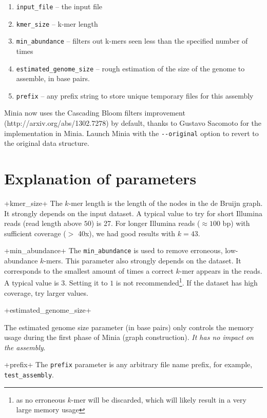 \documentclass[a4paper]{article}
\begin{document}
\begin{enumerate}

\item \verb+input_file+ -- the input file

\item \verb+kmer_size+  -- k-mer length 

\item \verb+min_abundance+ -- filters out k-mers seen less than the specified number of times

\item \verb+estimated_genome_size+ -- rough estimation of the size of the genome to assemble, in base pairs.

\item \verb+prefix+ -- any prefix string to store unique temporary files for this assembly

\end{enumerate}

Minia now uses the Cascading Bloom filters improvement (http://arxiv.org/abs/1302.7278) by default, thanks to Gustavo Sacomoto for the implementation in Minia. Launch Minia with the \verb!--original! option to revert to the original data structure.


\section{Explanation of parameters}
\begin{description}

\vitem+kmer_size+
The $k$-mer length is the length of the nodes in the de Bruijn graph. It strongly depends on the input dataset. A typical value to try for short Illumina reads (read length above $50$) is 27. For longer Illumina reads ($\approx 100$ bp) with sufficient coverage ($>$ 40x), we had good results with $k=43$.

\vitem+min_abundance+
The \verb+min_abundance+ is used to remove erroneous, low-abundance $k$-mers. This parameter also strongly depends on the dataset. It corresponds to the smallest amount of times a correct $k$-mer appears in the reads. A typical value is $3$. Setting it to $1$ is not recommended\footnote{as no erroneous $k$-mer will be discarded, which will likely result in a very large memory usage}. If the dataset has high coverage, try larger values.

\vitem+estimated_genome_size+

The estimated genome size parameter (in base pairs) only controls the memory usage during the first phase of Minia (graph construction). \emph{It has no impact on the assembly}.

\vitem+prefix+
The \verb+prefix+ parameter is any arbitrary file name prefix, for example, \verb+test_assembly+.

\end{description}
\end{document}

